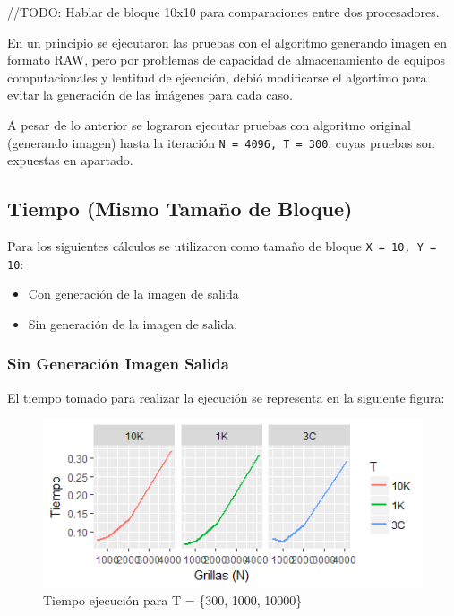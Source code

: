 \documentclass[jou]{apa6}
\begin{document}
//TODO: Hablar de bloque 10x10 para comparaciones entre dos procesadores.

En un principio se ejecutaron las pruebas con el algoritmo generando imagen en formato RAW, pero por problemas de capacidad de almacenamiento de equipos computacionales y lentitud de ejecución, debió modificarse el algortimo para evitar la generación de las imágenes para cada caso.

A pesar de lo anterior se lograron ejecutar pruebas con algoritmo original (generando imagen) hasta la iteración \texttt{N = 4096, T = 300}, cuyas pruebas son expuestas en apartado.

\subsection{Tiempo (Mismo Tamaño de Bloque)}

Para los siguientes cálculos se utilizaron como tamaño de bloque \texttt{X = 10, Y = 10}:

\begin{itemize}
	\item Con generación de la imagen de salida
	\item Sin generación de la imagen de salida.
\end{itemize}

\subsubsection{Sin Generación Imagen Salida}
El tiempo tomado para realizar la ejecución se representa en la siguiente figura:

\clearpage

\begin{figure}[h]
	\includegraphics[width=\columnwidth]{time-same-block-size-no-raw.png}
	\caption{Tiempo ejecución para T = \{300, 1000, 10000\}}
	\label{fig:Figure1}
\end{figure}
\end{document}
